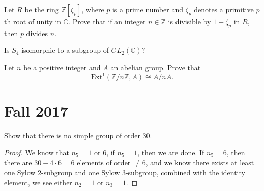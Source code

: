 \documentclass[openany]{book}
\begin{document}
\begin{prob}
    Let \(R\) be the ring \(\mathbb{Z}[\zeta_p]\), where \(p\) is a prime number and \(\zeta_p\) denotes a primitive \(p\)th root of unity in \(\mathbb{C}\). Prove that if an integer \(n \in \mathbb{Z}\) is divisible by \(1 - \zeta_p\) in \(R\), then \(p\) divides \(n\).
\end{prob}




\begin{prob}
    Is \(S_4\) isomorphic to a subgroup of \(GL_2(\mathbb{C})\)?
\end{prob}




\begin{prob}
    Let \(n\) be a positive integer and \(A\) an abelian group. Prove that
    \[\text{Ext}^1(\mathbb{Z}/n\mathbb{Z}, A) \cong A/nA.\]
\end{prob}





\chapter{Fall 2017}


\begin{prob}
    Show that there is no simple group of order 30.
\end{prob}
\begin{proof}
    We know that $n_5=1$ or $6$, if $n_5=1$, then we are done. If $n_5=6$, then there are $30-4\cdot 6=6$ elements of order $\neq 6$, and we know there exists at least one Sylow $2$-subgroup and one Sylow $3$-subgroup, combined with the identity element, we see either $n_2=1$ or $n_3=1$. 
\end{proof}
\end{document}
